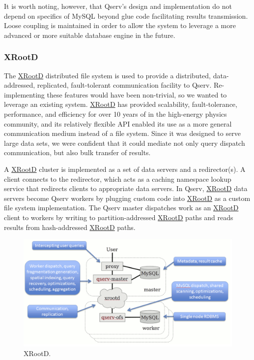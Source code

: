 \documentclass[DM,lsstdraft,toc]{lsstdoc}
\begin{document}
It is worth noting, however, that Qserv's design and implementation do
not depend on specifics of MySQL beyond glue code facilitating results
transmission. Loose coupling is maintained in order to allow the system
to leverage a more advanced or more suitable database engine in the
future.

\subsubsection{XRootD}\label{xrootd}

The \href{http://xrootd.org}{XRootD} distributed file system is used to
provide a distributed, data-addressed, replicated, fault-tolerant
communication facility to Qserv. Re-implementing these features would
have been non-trivial, so we wanted to leverage an existing system.
\href{http://xrootd.org}{XRootD} has provided scalability,
fault-tolerance, performance, and efficiency for over 10 years of in the
high-energy physics community, and its relatively flexible API enabled
its use as a more general communication medium instead of a file system.
Since it was designed to serve large data sets, we were confident that
it could mediate not only query dispatch communication, but also bulk
transfer of results.

A \href{http://xrootd.org}{XRootD} cluster is implemented as a set of
data servers and a redirector(s). A client connects to the redirector,
which acts as a caching namespace lookup service that redirects clients
to appropriate data servers. In Qserv, \href{http://xrootd.org}{XRootD}
data servers become Qserv workers by plugging custom code into
\href{http://xrootd.org}{XRootD} as a custom file system implementation.
The Qserv master dispatches work as an \href{http://xrootd.org}{XRootD}
client to workers by writing to partition-addressed
\href{http://xrootd.org}{XRootD} paths and reads results from
hash-addressed \href{http://xrootd.org}{XRootD} paths.

\begin{figure}[H]
\centering
\includegraphics{_static/xrootd.png}
\caption{XRootD.}
\end{figure}
\end{document}
